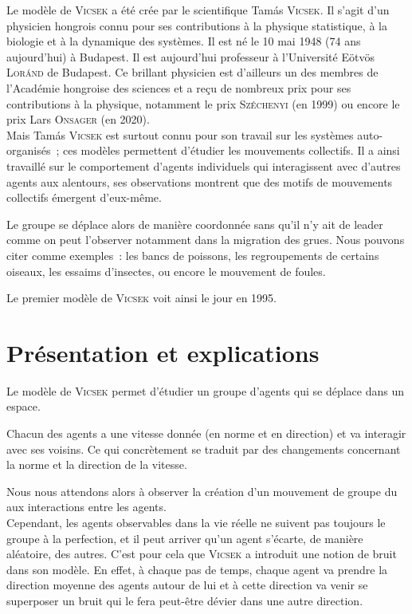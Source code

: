 \documentclass[french, a4paper, 12pt, openany]{report}
\begin{document}
	Le modèle de \textsc{Vicsek} a été crée par le scientifique Tamás \textsc{Vicsek}. Il s'agit d'un physicien hongrois connu pour ses contributions à la physique statistique, à la biologie et à la dynamique des systèmes. Il est né le 10 mai 1948 (74 ans aujourd'hui) à Budapest. Il est aujourd'hui professeur à l'Université Eötvös \textsc{Loránd} de Budapest. Ce brillant physicien est d'ailleurs un des membres de l'Académie hongroise des sciences et a reçu de nombreux prix pour ses contributions à la physique, notamment le prix \textsc{Széchenyi} (en 1999) ou encore le prix Lars \textsc{Onsager} (en 2020). \\

	Mais Tamás \textsc{Vicsek} est surtout connu pour son travail sur les systèmes auto-organisés~; ces modèles permettent d'étudier les mouvements collectifs. Il a ainsi travaillé sur le comportement d'agents individuels qui interagissent avec d'autres agents aux alentours, ses observations montrent que des motifs de mouvements collectifs émergent d'eux-même.
	
	Le groupe se déplace alors de manière coordonnée sans qu'il n'y ait de leader comme on peut l'observer notamment dans la migration des grues. Nous pouvons citer comme exemples~: les bancs de poissons, les regroupements de certains oiseaux, les essaims d'insectes, ou encore le mouvement de foules.

	 Le premier modèle de \textsc{Vicsek} voit ainsi le jour en 1995.\\
	 
	 
	 
	
\chapter{Présentation et explications}	

	Le modèle de \textsc{Vicsek} permet d'étudier un groupe d'agents qui se déplace dans un espace.
	
	Chacun des agents a une vitesse donnée (en norme et en direction) et va interagir avec ses voisins. Ce qui concrètement se traduit par des changements concernant la norme et la direction de la vitesse.
	
	Nous nous attendons alors à observer la création d'un mouvement de groupe du aux interactions entre les agents. \\
	
	Cependant, les agents observables dans la vie réelle ne suivent pas toujours le groupe à la perfection, et il peut arriver qu'un agent s'écarte, de manière aléatoire, des autres. C'est pour cela que \textsc{Vicsek} a introduit une notion de bruit dans son modèle. En effet, à chaque pas de temps, chaque agent va prendre la direction moyenne des agents autour de lui et à cette direction va venir se superposer un bruit qui le fera peut-être dévier dans une autre direction.
	
\end{document}
